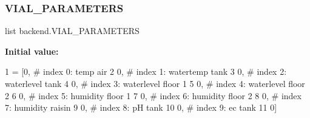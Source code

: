 \subsubsection{\texorpdfstring{V\+I\+A\+L\+\_\+\+P\+A\+R\+A\+M\+E\+T\+E\+RS}{VIAL\_PARAMETERS}}
{\footnotesize\ttfamily list backend.\+V\+I\+A\+L\+\_\+\+P\+A\+R\+A\+M\+E\+T\+E\+RS}

{\bfseries Initial value\+:}
\begin{DoxyCode}
1 =  [0,  \textcolor{comment}{# index 0: temp air}
2                    0,  \textcolor{comment}{# index 1: watertemp tank}
3                    0,  \textcolor{comment}{# index 2: waterlevel tank}
4                    0,  \textcolor{comment}{# index 3: waterlevel floor 1}
5                    0,  \textcolor{comment}{# index 4: waterlevel floor 2}
6                    0,  \textcolor{comment}{# index 5: humidity floor 1}
7                    0,  \textcolor{comment}{# index 6: humidity floor 2}
8                    0,  \textcolor{comment}{# index 7: humidity raisin}
9                    0,  \textcolor{comment}{# index 8: pH tank}
10                    0,  \textcolor{comment}{# index 9: ec tank}
11                    0]
\end{DoxyCode}
